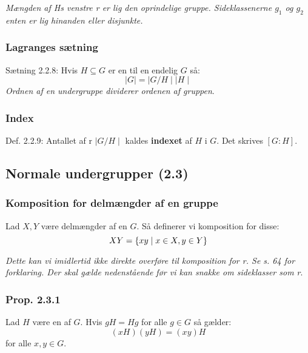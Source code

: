 \textit{Mængden af Hs venstre r er lig den oprindelige
gruppe. Sideklassenerne $g_1$ og $g_2$ enten er lig hinanden eller disjunkte.}

\subsubsection{Lagranges sætning}
\label{Lagranges saetning}
Sætning 2.2.8: Hvis $H \subseteq G$ er en  til en endelig
 $G$ så:
\begin{equation*}
  \mid G\mid = \mid G/H \mid \mid H\mid
\end{equation*}
\textit{Ordnen af en undergruppe dividerer ordenen af gruppen}.

\subsubsection{Index}
\label{Index}
Def. 2.2.9: Antallet af r $\mid G/H \mid$ kaldes
\textbf{indexet} af $H$ i $G$. Det skrives $[G : H]$.

\subsection{Normale undergrupper (2.3)}
\subsubsection{Komposition for delmængder af en gruppe}
\label{Komp_for_subsets}
Lad $X, Y$ være delmængder af en  $G$. Så definerer vi
komposition for disse:
\begin{equation*}
  XY = \{ xy \mid x \in X, y \in Y \}
\end{equation*}

\textit{Dette kan vi imidlertid ikke direkte overføre til komposition for
r. Se s. 64 for forklaring. Der skal gælde nedenstående før
vi kan snakke om sideklasser som r}.

\subsubsection{Prop. 2.3.1}
\label{2.3.1}
Lad $H$ være en  af $G$. Hvis $gH = Hg$ for alle $g \in G$
så gælder:
\begin{equation*}
  (xH)(yH) = (xy)H
\end{equation*}
for alle $x, y \in G$.

